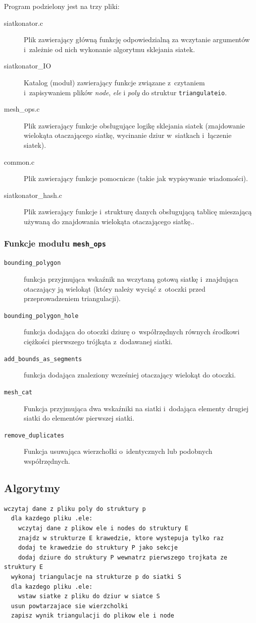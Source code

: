 \documentclass[a4paper]{article} \usepackage{setspace}
\begin{document}
  Program podzielony jest na trzy pliki:
  \begin{description}
    \item[siatkonator.c] Plik zawierający główną funkcję odpowiedzialną za wczytanie argumentów i~zależnie od nich wykonanie algorytmu sklejania siatek.
    \item[siatkonator\_IO] Katalog (moduł) zawierający funkcje związane z~czytaniem i~zapisywaniem plików \emph{node}, \emph{ele} i \emph{poly} do struktur \texttt{triangulateio}.
    \item[mesh\_ops.c] Plik zawierający funkcje obsługujące logikę sklejania siatek (znajdowanie wielokąta otaczającego siatkę, wycinanie dziur w~siatkach i~łączenie siatek).
    \item[common.c] Plik zawierający funkcje pomocnicze (takie jak wypisywanie wiadomości).
    \item[siatkonator\_hash.c] Plik zawierający funkcje i~strukturę danych obsługującą tablicę mieszającą używaną do znajdowania wielokąta otaczającego siatkę..
  \end{description}

\subsubsection{Funkcje modułu \texttt{mesh\_ops}}
\begin{description}
  \item[\texttt{bounding\_polygon}] funkcja przyjmująca wskaźnik na wczytaną gotową siatkę i~znajdująca otaczający ją wielokąt (który należy wyciąć z~otoczki przed przeprowadzeniem triangulacji).
  \item[\texttt{bounding\_polygon\_hole}] funkcja dodająca do otoczki dziurę o~współrzędnych równych środkowi ciężkości pierwszego trójkąta z~dodawanej siatki.
  \item[\texttt{add\_bounds\_as\_segments}] funkcja dodająca znaleziony wcześniej otaczający wielokąt do otoczki.
  \item[\texttt{mesh\_cat}] Funkcja przyjmująca dwa wskaźniki na siatki i~dodająca elementy drugiej siatki do elementów pierwszej siatki.
  \item[\texttt{remove\_duplicates}] Funkcja usuwająca wierzchołki o~identycznych lub podobnych współrzędnych.
\end{description}

\subsection{Algorytmy}
\begin{lstlisting}[caption=Pseudokod algorytmu głównej funkcji programu sklejającej siatki]
  wczytaj dane z pliku poly do struktury p
  dla kazdego pliku .ele:
    wczytaj dane z plikow ele i nodes do struktury E
    znajdz w strukturze E krawedzie, ktore wystepuja tylko raz
    dodaj te krawedzie do struktury P jako sekcje
    dodaj dziure do struktury P wewnatrz pierwszego trojkata ze struktury E
  wykonaj triangulacje na strukturze p do siatki S
  dla kazdego pliku .ele:
    wstaw siatke z pliku do dziur w siatce S
  usun powtarzajace sie wierzcholki
  zapisz wynik triangulacji do plikow ele i node
\end{lstlisting}
\end{document}
